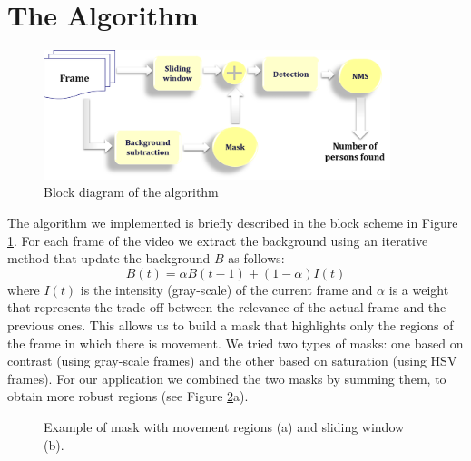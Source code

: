 \documentclass[a4paper, 11pt, onecolumn]{article} %
\begin{document}
\section{The Algorithm}\label{algorithm}
\begin{figure}[h!]
\centering
\includegraphics[width=0.9\textwidth]{schema.png} 
\caption{Block diagram of the algorithm}
\label{fig:diagram}
\end{figure}
\noindent
The algorithm we implemented is briefly described in the block scheme in Figure \ref{fig:diagram}. For each frame of the video we extract the background using an iterative method that update the background $B$ as follows: 
$$B(t) = \alpha B(t-1) + (1-\alpha) I(t)$$
where $I(t)$ is the intensity (gray-scale) of the current frame and $\alpha$ is a weight that represents the trade-off between the relevance of the actual frame and the previous ones.
This allows us to build a mask that highlights only the regions of the frame in which there is movement. We tried two types of masks: one based on contrast (using gray-scale frames) and the other based on saturation (using HSV frames). For our application we combined the two masks by summing them, to obtain more robust regions (see Figure \ref{fig:mask}a). 
\begin{figure}[h!]
\centering
{}
\caption{Example of mask with movement regions (a) and sliding window (b).}
\label{fig:mask}
\end{figure}
\end{document}
